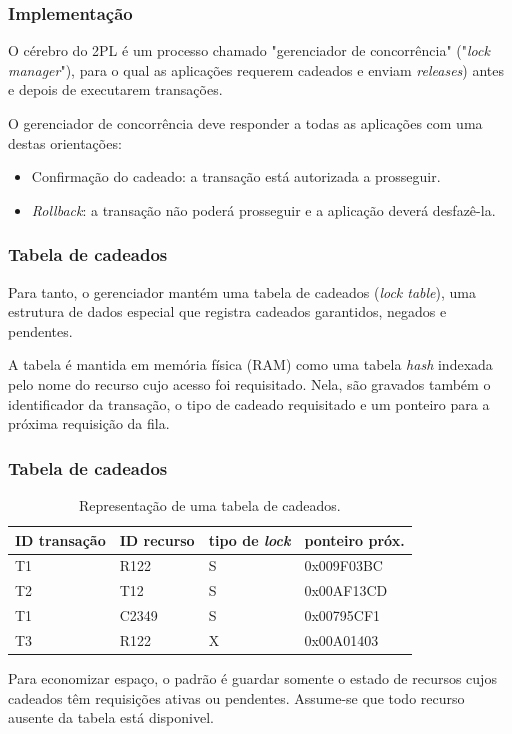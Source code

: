 \documentclass{beamer}
\begin{document}

\begin{frame} %
    \frametitle{Implementação}

    O cérebro do 2PL é um processo chamado "gerenciador de concorrência" ("\emph{lock manager}"), para o qual as aplicações requerem cadeados e enviam \emph{releases}) antes e depois de executarem transações.

    \medskip
    O gerenciador de concorrência deve responder a todas as aplicações com uma destas orientações:

    \begin{itemize}
        \item Confirmação do cadeado: a transação está autorizada a prosseguir.
        \item \emph{Rollback}: a transação não poderá prosseguir e a aplicação deverá desfazê-la.
    \end{itemize}
\end{frame}


\begin{frame} %
    \frametitle{Tabela de cadeados}
    Para tanto, o gerenciador mantém uma tabela de cadeados (\emph{lock table}), uma estrutura de dados especial que registra cadeados garantidos, negados e pendentes.

    \medskip
    A tabela é mantida em memória física (RAM) como uma tabela \emph{hash} indexada pelo nome do recurso cujo acesso foi requisitado. Nela, são gravados também o identificador da transação, o tipo de cadeado requisitado e um ponteiro para a próxima requisição da fila.
\end{frame}


\begin{frame} %
    \frametitle{Tabela de cadeados}

    \begin{table}
    \begin{tabular}{l l l l}
        \toprule

        \textbf{ID transação} & \textbf{ID recurso} & \textbf{tipo de \emph{lock}} & \textbf{ponteiro próx.}\\

        \midrule

        T1 & R122 & S & 0x009F03BC \\
        T2 & T12 & S & 0x00AF13CD \\
        T1 & C2349 & S & 0x00795CF1 \\
        T3 & R122 & X & 0x00A01403 \\

        \bottomrule
    \end{tabular}
    \caption{Representação de uma tabela de cadeados.}
    \end{table}

    \medskip
    Para economizar espaço, o padrão é guardar somente o estado de recursos cujos cadeados têm requisições ativas ou pendentes. Assume-se que todo recurso ausente da tabela está disponivel.
\end{frame}
    
\end{document}
